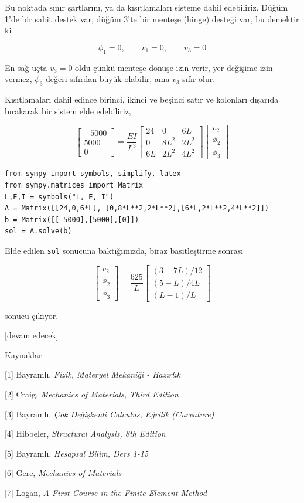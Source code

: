 \documentclass[12pt,fleqn]{article}\usepackage{../../common}
\begin{document}
Bu noktada sınır şartlarını, ya da kısıtlamaları sisteme dahil edebiliriz.
Düğüm 1'de bir sabit destek var, düğüm 3'te bir menteşe (hinge) desteği var,
bu demektir ki

$$
\phi_1 = 0, \qquad
v_1 = 0, \qquad
v_3 = 0
$$

En sağ uçta $v_3 = 0$ oldu çünkü menteşe dönüşe izin verir, yer değişime
izin vermez, $\phi_3$ değeri sıfırdan büyük olabilir, ama $v_3$ sıfır olur.

Kısıtlamaları dahil edince birinci, ikinci ve beşinci satır ve kolonları
dışarıda bırakarak bir sistem elde edebiliriz,

$$
\left[\begin{array}{c}
-5000 \\ 5000 \\ 0
\end{array}\right] =
\frac{EI}{L^3}
\left[\begin{array}{ccc}
24 & 0 & 6L \\
0 & 8L^2 & 2L^2 \\
6L & 2L^2 & 4L^2
\end{array}\right]
\left[\begin{array}{c}
v_2 \\ \phi_2 \\ \phi_3
\end{array}\right]
$$

\begin{verbatim}
from sympy import symbols, simplify, latex
from sympy.matrices import Matrix
L,E,I = symbols("L, E, I")
A = Matrix([[24,0,6*L], [0,8*L**2,2*L**2],[6*L,2*L**2,4*L**2]])
b = Matrix([[-5000],[5000],[0]])
sol = A.solve(b)
\end{verbatim}

Elde edilen \verb!sol! sonucuna baktığımızda, biraz basitleştirme sonrası

$$
\left[\begin{array}{c}
v_2 \\ \phi_2 \\ \phi_3
\end{array}\right] =
\frac{625}{L}
\left[\begin{array}{c}
(3-7L)/12 \\
(5-L)/4L \\
(L-1)/L
\end{array}\right]
$$

sonucu çıkıyor.


[devam edecek]

Kaynaklar

[1] Bayramlı, {\em Fizik, Materyel Mekaniği - Hazırlık}

[2] Craig, {\em Mechanics of Materials, Third Edition}

[3] Bayramlı, {\em Çok Değişkenli Calculus, Eğrilik (Curvature)}

[4] Hibbeler, {\em Structural Analysis, 8th Edition}

[5] Bayramlı, {\em Hesapsal Bilim, Ders 1-15}

[6] Gere, {\em Mechanics of Materials}

[7] Logan, {\em A First Course in the Finite Element Method}
\end{document}
